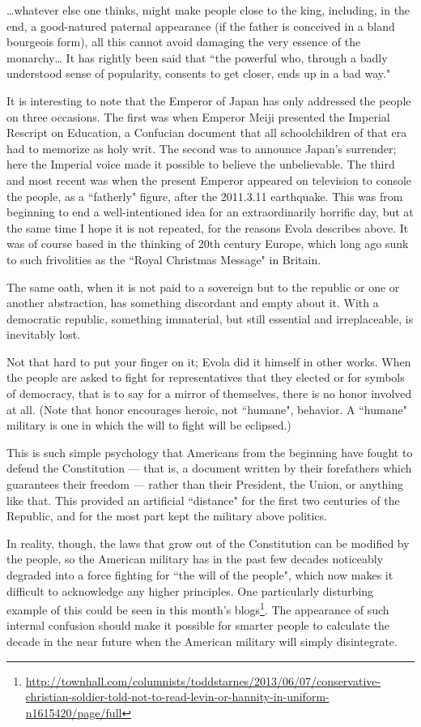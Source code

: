 \begin{footnotesize}
\begin{sffamily}
…whatever else one thinks, might make people close to the king, including, in the end, a good-natured paternal appearance (if the father is conceived in a bland bourgeois form), all this cannot avoid damaging the very essence of the monarchy… It has rightly been said that ``the powerful who, through a badly understood sense of popularity, consents to get closer, ends up in a bad way."

It is interesting to note that the Emperor of Japan has only addressed the people on three occasions. The first was when Emperor Meiji presented the Imperial Rescript on Education, a Confucian document that all schoolchildren of that era had to memorize as holy writ. The second was to announce Japan's surrender; here the Imperial voice made it possible to believe the unbelievable. The third and most recent was when the present Emperor appeared on television to console the people, as a ``fatherly" figure, after the 2011.3.11 earthquake. This was from beginning to end a well-intentioned idea for an extraordinarily horrific day, but at the same time I hope it is not repeated, for the reasons Evola describes above. It was of course based in the thinking of 20th century Europe, which long ago sunk to such frivolities as the ``Royal Christmas Message" in Britain.

The same oath, when it is not paid to a sovereign but to the republic or one or another abstraction, has something discordant and empty about it. With a democratic republic, something immaterial, but still essential and irreplaceable, is inevitably lost.

Not that hard to put your finger on it; Evola did it himself in other works. When the people are asked to fight for representatives that they elected or for symbols of democracy, that is to say for a mirror of themselves, there is no honor involved at all. (Note that honor encourages heroic, not ``humane", behavior. A ``humane" military is one in which the will to fight will be eclipsed.)

This is such simple psychology that Americans from the beginning have fought to defend the Constitution — that is, a document written by their forefathers which guarantees their freedom — rather than their President, the Union, or anything like that. This provided an artificial ``distance" for the first two centuries of the Republic, and for the most part kept the military above politics.

In reality, though, the laws that grow out of the Constitution can be modified by the people, so the American military has in the past few decades noticeably degraded into a force fighting for ``the will of the people", which now makes it difficult to acknowledge any higher principles. One particularly disturbing example of this could be seen in this month's blogs\footnote{\url{http://townhall.com/columnists/toddstarnes/2013/06/07/conservative-christian-soldier-told-not-to-read-levin-or-hannity-in-uniform-n1615420/page/full}}. The appearance of such internal confusion should make it possible for smarter people to calculate the decade in the near future when the American military will simply disintegrate.


\end{sffamily}
\end{footnotesize}
